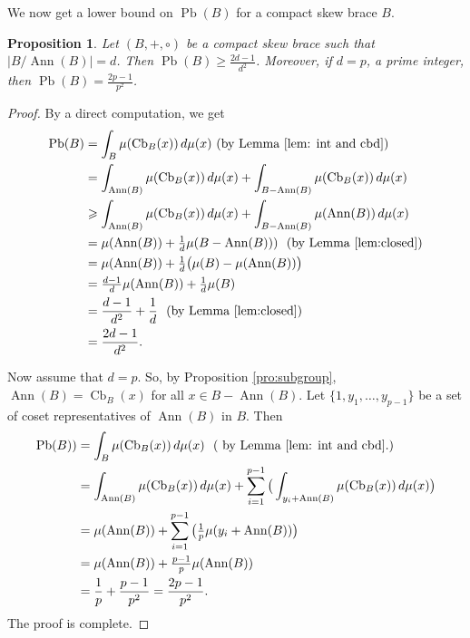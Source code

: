 \documentclass[oneside]{amsart}
\numberwithin{equation}{section}
\theoremstyle{plain}
\newtheorem{pro}[equation]{Proposition}
\theoremstyle{definition}
\newcommand{\Cb}{\operatorname{Cb} }
\newcommand{\Pb}{\operatorname{Pb} }
\newcommand{\Ann}{\operatorname{Ann} }
\begin{document}
We now get a lower bound  on $\Pb(B)$ for a compact  skew brace $B$.
\begin{pro}\label{pro:infinite and index p}
    Let $(B,+, \circ)$ be a compact  skew brace such that $|B/\Ann(B)|=d$.  Then $\Pb(B)\geqslant \frac{2d-1}{d^2}$. Moreover, if $d = p$, a prime integer,  then $\Pb(B)=\frac{2p-1}{p^2}$. 
\end{pro}
\begin{proof}
By a direct computation, we get
 \begin{align*}
    \Pb(B) &= \int_{B} \mu(\Cb_{B}(x)) \, d \mu(x) ~(\text{by Lemma }\ref{lem: int and cbd})\\
           &= \int_{\Ann(B)} \mu(\Cb_{B}(x)) \, d\mu(x) + \int_{B - \Ann(B)} \mu(\Cb_{B}(x)) \, d\mu(x)\\
           &\geqslant \int_{\Ann(B)}  \mu(\Cb_{B}(x)) \, d\mu(x) + \int_{B - \Ann(B)} \mu(\Ann(B)) \, d\mu(x)\\
           & = \mu(\Ann(B)) + \tfrac{1}{d}\mu(B - \Ann(B))) ~~(\text{by Lemma }\ref{lem:closed})\\
           & = \mu(\Ann(B)) + \tfrac{1}{d}\big(\mu(B) - \mu(\Ann(B))\big)\\
           &= \tfrac{d-1}{d}\mu(\Ann(B)) +\tfrac{1}{d} \mu(B)\\
           &=\frac{d-1}{d^2}+\frac{1}{d} ~~(\text{by Lemma }\ref{lem:closed})\\
           &=\frac{2d-1}{d^2}.   
\end{align*}

Now assume that $d = p$. So,  by Proposition \ref{pro:subgroup}, $\Ann(B)=\Cb_{B}(x)$ for all $x\in B-\Ann(B)$. Let $\{1, y_1, \ldots, y_{p-1}\}$ be a set of coset representatives of $\Ann(B)$ in $B$. Then
\begin{align*}
    \Pb(B)) &= \int_{B} \mu(\Cb_{B}(x)) \, d\mu(x) ~~(\text{ by Lemma }\ref{lem: int and cbd}.)\\
           &= \int_{\Ann(B)} \mu(\Cb_{B}(x)) \, d\mu(x) + \sum_{i=1}^{p-1}\big(\int_{ y_i+\Ann(B)} \mu(\Cb_{B}(x)) \, d\mu(x)\big) \\
           & = \mu(\Ann(B)) + \sum_{i=1}^{p-1} \big(\tfrac{1}{p}\mu(y_i + \Ann(B))\big)\\
           &= \mu(\Ann(B))+\tfrac{p-1}{p}\mu(\Ann(B))\\
           &=\frac{1}{p}+\frac{p-1}{p^2}=\frac{2p-1}{p^2}.           
\end{align*}
The proof is complete.
\end{proof}
\end{document}
